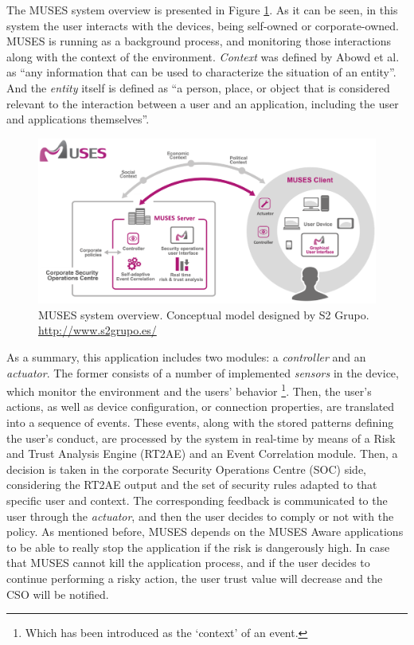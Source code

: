 \label{chap:appendixmuses}
\minitoc\mtcskip
\vfill

The MUSES system overview is presented in Figure \ref{fig:system_overview}. As it can be seen, in this system the user interacts with the devices, being self-owned or corporate-owned. MUSES is running as a background process, and monitoring those interactions along with the context of the environment. \textit{Context} was defined by Abowd et al. \cite{abowd1999towards} as ``any information that can be used to characterize the situation of an entity''. And the \textit{entity} itself is defined as ``a person, place, or object that is considered relevant to the interaction between a user and an application, including the user and applications
themselves''.

\begin{figure}
\centering
 \includegraphics[scale =0.17] {gfx/byodSotA/system_overview.eps}
\caption{MUSES system overview. Conceptual model designed by S2 Grupo. \url{http://www.s2grupo.es/}}
\label{fig:system_overview}
\end{figure}

As a summary, this application includes two modules: a \textit{controller} and an \textit{actuator}. The former consists of a number of implemented \textit{sensors} in the device, which monitor the environment and the users' behavior \footnote{Which has been introduced as the `context' of an event.}. Then, the user's actions, as well as device configuration, or connection properties, are translated into a sequence of events. These events, along with the stored patterns defining the user's conduct, are processed by the system in real-time by means of a Risk and Trust Analysis Engine (RT2AE) and an Event Correlation module. Then, a decision is taken in the corporate Security Operations Centre (SOC) side, considering the RT2AE output and the set of security rules adapted to that specific user and context. The corresponding feedback is communicated to the user through the \textit{actuator}, and then the user decides to comply or not with the policy. As mentioned before, MUSES depends on the MUSES Aware applications to be able to really stop the application if the risk is dangerously high. In case that MUSES cannot kill the application process, and if the user decides to continue performing a risky action, the user trust value will decrease and the CSO will be notified.

